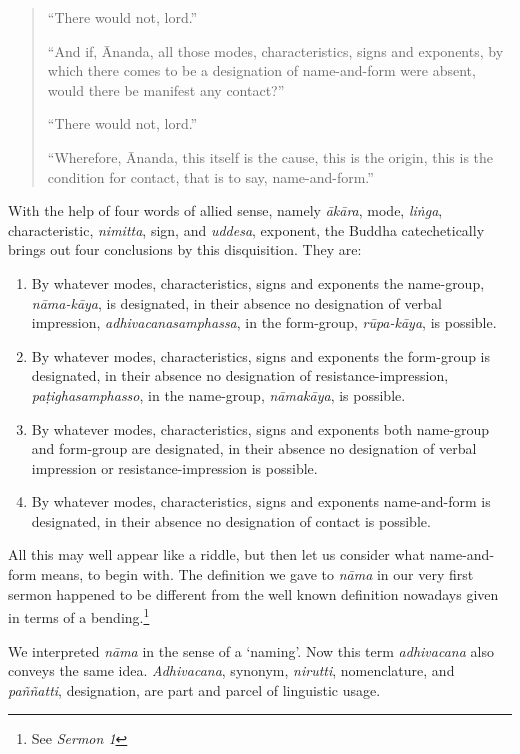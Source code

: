 \begin{quote}
``There would not, lord.''

``And if, Ānanda, all those modes, characteristics, signs and exponents, by which there comes to be a designation of name-and-form were absent, would there be manifest any contact?''

``There would not, lord.''

``Wherefore, Ānanda, this itself is the cause, this is the origin, this is the condition for contact, that is to say, name-and-form.''
\end{quote}

With the help of four words of allied sense, namely \emph{ākāra}, mode, \emph{liṅga}, characteristic, \emph{nimitta}, sign, and \emph{uddesa}, exponent, the Buddha catechetically brings out four conclusions by this disquisition. They are:

\vspace*{-0.5\baselineskip}

\enlargethispage{\baselineskip}

\begin{enumerate}
\def\labelenumi{\arabic{enumi}.}
\item
  By whatever modes, characteristics, signs and exponents the name-group, \emph{nāma-kāya}, is designated, in their absence no designation of verbal impression, \emph{adhivacanasamphassa}, in the form-group, \emph{rūpa-kāya}, is possible.
\item
  By whatever modes, characteristics, signs and exponents the form-group is designated, in their absence no designation of resistance-impression, \emph{paṭighasamphasso}, in the name-group, \emph{nāmakāya}, is possible.
\item
  By whatever modes, characteristics, signs and exponents both name-group and form-group are designated, in their absence no designation of verbal impression or resistance-impression is possible.
\item
  By whatever modes, characteristics, signs and exponents name-and-form is designated, in their absence no designation of contact is possible.
\end{enumerate}

All this may well appear like a riddle, but then let us consider what name-and-form means, to begin with. The definition we gave to \emph{nāma} in our very first sermon happened to be different from the well known definition nowadays given in terms of a bending.\footnote{See \emph{Sermon 1}}

We interpreted \emph{nāma} in the sense of a `naming'. Now this term \emph{adhivacana} also conveys the same idea. \emph{Adhivacana}, synonym, \emph{nirutti}, nomenclature, and \emph{paññatti}, designation, are part and parcel of linguistic usage.

